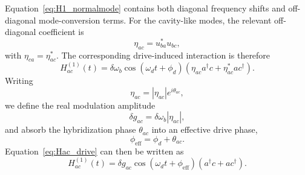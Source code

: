 Equation~\eqref{eq:H1_normalmode} contains both diagonal frequency shifts and off-diagonal mode-conversion terms. For the cavity-like modes, the relevant off-diagonal coefficient is
\begin{equation}
    \eta_{ac} = u_{ba}^* u_{bc},
\end{equation}
with \(\eta_{ca}=\eta_{ac}^*\). The corresponding drive-induced interaction is therefore
\begin{equation}
    H^{(1)}_{ac}(t)
    =
    \delta\omega_b \cos(\omega_d t+\phi_d)
    \left(
        \eta_{ac}a^\dagger c
        +
        \eta_{ac}^*a c^\dagger
    \right).
    \label{eq:Hac_drive}
\end{equation}
Writing
\begin{equation}
    \eta_{ac}=|\eta_{ac}|e^{i\theta_{ac}},
\end{equation}
we define the real modulation amplitude
\begin{equation}
    \delta g_{ac}=\delta\omega_b|\eta_{ac}|,
\end{equation}
and absorb the hybridization phase \(\theta_{ac}\) into an effective drive phase,
\begin{equation}
    \phi_{\mathrm{eff}}=\phi_d+\theta_{ac}.
\end{equation}
Equation~\eqref{eq:Hac_drive} can then be written as
\begin{equation}
    H^{(1)}_{ac}(t)
    =
    \delta g_{ac}\cos(\omega_d t+\phi_{\mathrm{eff}})
    \left(
        a^\dagger c + a c^\dagger
    \right).
\end{equation}

